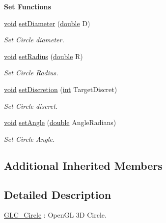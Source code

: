 \begin{Indent}{\bf Set Functions}\par
\begin{DoxyCompactItemize}
\item 
\hyperlink{group___u_a_v_objects_plugin_ga444cf2ff3f0ecbe028adce838d373f5c}{void} \hyperlink{class_g_l_c___circle_a9d63a13ca2c00bf8be75dd6cee279fef}{set\-Diameter} (\hyperlink{_super_l_u_support_8h_a8956b2b9f49bf918deed98379d159ca7}{double} D)
\begin{DoxyCompactList}\small\item\em Set Circle diameter. \end{DoxyCompactList}\item 
\hyperlink{group___u_a_v_objects_plugin_ga444cf2ff3f0ecbe028adce838d373f5c}{void} \hyperlink{class_g_l_c___circle_ac49c483e401b72ee8b9b25de0860d7bc}{set\-Radius} (\hyperlink{_super_l_u_support_8h_a8956b2b9f49bf918deed98379d159ca7}{double} R)
\begin{DoxyCompactList}\small\item\em Set Circle Radius. \end{DoxyCompactList}\item 
\hyperlink{group___u_a_v_objects_plugin_ga444cf2ff3f0ecbe028adce838d373f5c}{void} \hyperlink{class_g_l_c___circle_a41fdc40bb14f232b93fb9bc35eea8e43}{set\-Discretion} (\hyperlink{ioapi_8h_a787fa3cf048117ba7123753c1e74fcd6}{int} Target\-Discret)
\begin{DoxyCompactList}\small\item\em Set Circle discret. \end{DoxyCompactList}\item 
\hyperlink{group___u_a_v_objects_plugin_ga444cf2ff3f0ecbe028adce838d373f5c}{void} \hyperlink{class_g_l_c___circle_a39bca3bbb8d23f3b4afd2586ed8a04fa}{set\-Angle} (\hyperlink{_super_l_u_support_8h_a8956b2b9f49bf918deed98379d159ca7}{double} Angle\-Radians)
\begin{DoxyCompactList}\small\item\em Set Circle Angle. \end{DoxyCompactList}\end{DoxyCompactItemize}
\end{Indent}
\subsection*{Additional Inherited Members}


\subsection{Detailed Description}
\hyperlink{class_g_l_c___circle}{G\-L\-C\-\_\-\-Circle} \-: Open\-G\-L 3\-D Circle. 

